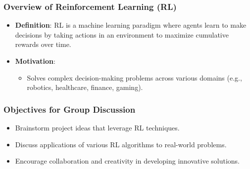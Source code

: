 \documentclass[aspectratio=169]{beamer}
\begin{document}
\begin{frame}[fragile]
    \frametitle{Overview of Reinforcement Learning (RL)}
    \begin{itemize}
        \item \textbf{Definition}: RL is a machine learning paradigm where agents learn to make decisions by taking actions in an environment to maximize cumulative rewards over time.
        \item \textbf{Motivation}: 
          \begin{itemize}
              \item Solves complex decision-making problems across various domains (e.g., robotics, healthcare, finance, gaming).
          \end{itemize}
    \end{itemize}
\end{frame}

\begin{frame}[fragile]
    \frametitle{Objectives for Group Discussion}
    \begin{itemize}
        \item Brainstorm project ideas that leverage RL techniques.
        \item Discuss applications of various RL algorithms to real-world problems.
        \item Encourage collaboration and creativity in developing innovative solutions.
    \end{itemize}
\end{frame}
\end{document}

